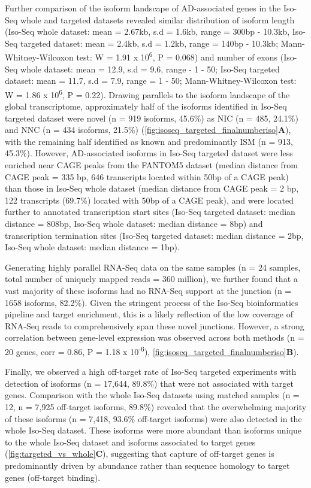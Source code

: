 Further comparison of the isoform landscape of AD-associated genes in the Iso-Seq whole and targeted datasets revealed similar distribution of isoform length (Iso-Seq whole dataset: mean = 2.67kb, s.d = 1.6kb, range = 300bp - 10.3kb, Iso-Seq targeted dataset: mean = 2.4kb, s.d = 1.2kb, range = 140bp - 10.3kb; Mann-Whitney-Wilcoxon test: W = 1.91 x 10\textsuperscript{6}, P = 0.068) and number of exons (Iso-Seq whole dataset: mean = 12.9, s.d = 9.6, range - 1 - 50; Iso-Seq targeted dataset: mean = 11.7, s.d = 7.9, range = 1 - 50; Mann-Whitney-Wilcoxon test: W = 1.86 x 10\textsuperscript{6}, P = 0.22). Drawing parallels to the isoform landscape of the global transcriptome, approximately half of the isoforms identified in Iso-Seq targeted dataset were novel (n = 919 isoforms, 45.6\%) as NIC (n = 485, 24.1\%) and NNC (n = 434 isoforms, 21.5\%) (\cref{fig:isoseq_targeted_finalnumberiso}\textbf{A}), with the remaining half identified as known and predominantly ISM (n = 913, 45.3\%). However, AD-associated isoforms in Iso-Seq targeted dataset were less enriched near CAGE peaks from the FANTOM5 dataset (median distance from CAGE peak = 335 bp, 646 transcripts located within 50bp of a CAGE peak) than those in Iso-Seq whole dataset (median distance from CAGE peak = 2 bp, 122 transcripts (69.7\%) located with 50bp of a CAGE peak), and were located further to annotated transcription start sites (Iso-Seq targeted dataset: median distance = 808bp, Iso-Seq whole dataset: median distance = 8bp) and transcription termination sites (Iso-Seq targeted dataset: median distance = 2bp, Iso-Seq whole dataset: median distance = 1bp). 

Generating highly parallel RNA-Seq data on the same samples (n = 24 samples, total number of uniquely mapped reads = 360 million), we further found that a vast majority of these isoforms had no RNA-Seq support at the junction (n = 1658 isoforms, 82.2\%). Given the stringent process of the Iso-Seq bioinformatics pipeline and target enrichment, this is a likely reflection of the low coverage of RNA-Seq reads to comprehensively span these novel junctions. However, a strong correlation between gene-level expression was observed across both methods (n = 20 genes, corr = 0.86, P = 1.18 x 10\textsuperscript{-6}), \cref{fig:isoseq_targeted_finalnumberiso}\textbf{B}). 

Finally, we observed a high off-target rate of Iso-Seq targeted experiments with detection of isoforms (n = 17,644, 89.8\%) that were not associated with target genes. Comparison with the whole Iso-Seq datasets using matched samples (n = 12, n = 7,925 off-target isoforms, 89.8\%) revealed that the overwhelming majority of these isoforms (n = 7,418, 93.6\% off-target isoforms) were also detected in the whole Iso-Seq dataset. These isoforms were more abundant than isoforms unique to the whole Iso-Seq dataset and isoforms associated to target genes (\cref{fig:targeted_vs_whole}\textbf{C}), suggesting that capture of off-target genes is predominantly driven by abundance rather than sequence homology to target genes (off-target binding).  

